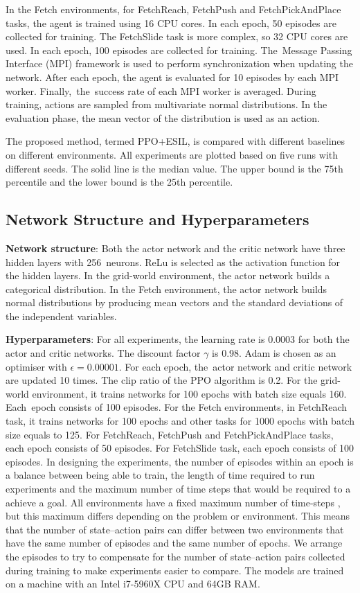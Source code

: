 In the Fetch environments, for FetchReach, FetchPush and FetchPickAndPlace tasks, the agent is trained using 16 CPU cores. In each epoch, 50 episodes are collected for training. The FetchSlide task is more complex, so 32 CPU cores are used. In each epoch, 100 episodes are collected for training. The~{Message Passing Interface (MPI) framework is used to perform}  synchronization when updating the network. After each epoch, the agent is evaluated for 10 episodes by each MPI worker. Finally,~the~success rate of each MPI worker is averaged. During training, actions are sampled from {multivariate normal} distributions. In the evaluation phase, the mean vector of the distribution is used as an action. 

The proposed method, termed PPO+ESIL, is compared with different baselines on different environments. All experiments are plotted based on five runs with different seeds. The solid line is the median value. The upper bound is the {75th} percentile and the lower bound is the {25th} percentile.

\subsection{Network Structure and Hyperparameters}
\textbf{Network structure}: Both the actor network and the critic network have three hidden layers with 256~neurons. ReLu is selected as the activation function for the hidden layers. In the grid-world environment, the actor network builds a categorical distribution. In the Fetch environment, the actor network builds normal {distributions by producing mean vectors and the standard deviations of the independent variables}.

\textbf{Hyperparameters}: For all experiments, the learning rate is 0.0003 for both the actor and critic networks. The discount factor $\gamma$ is 0.98. Adam is chosen as an optimiser with $\epsilon=0.00001$. For each epoch, the~actor network and critic network are updated 10 times. The clip ratio of the PPO algorithm is 0.2. For the grid-world environment, it trains networks for 100 epochs with batch size equals 160. Each~epoch consists of 100 episodes. For the Fetch environments, in FetchReach task, it trains networks for 100 epochs and other tasks for 1000 epochs with batch size equals to 125. For FetchReach, FetchPush and FetchPickAndPlace tasks, each epoch consists of 50 episodes. For FetchSlide task, each epoch consists of 100 episodes. {In designing the experiments, the number of episodes within an epoch is a balance between being able to train, the length of time required to run experiments and the maximum number of time steps that would be required to a achieve a goal. All environments have a fixed maximum number of time-steps , but this maximum differs depending on the problem or environment. This means that the number of state--action pairs can differ between two environments that have the same number of episodes and the same number of epochs. We arrange the episodes to try to compensate for the number of state--action pairs collected during training to make experiments easier to compare.} {The models are trained on a machine with an Intel i7-5960X CPU and 64GB RAM.} 

